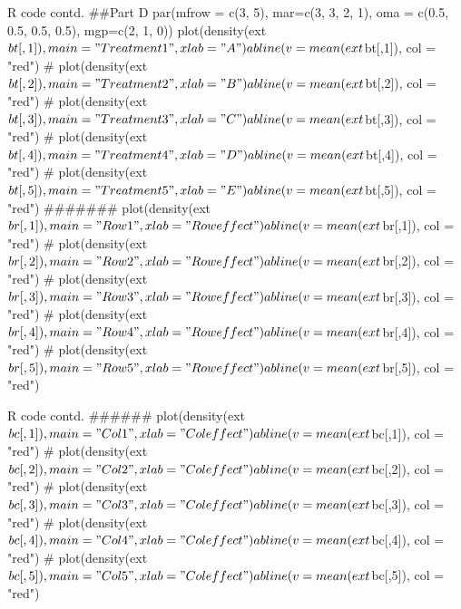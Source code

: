 \documentclass{article}
\begin{document}
\begin{sexylisting}{R code contd.}
##Part D
par(mfrow = c(3, 5),
    mar=c(3, 3, 2, 1),
    oma = c(0.5, 0.5, 0.5, 0.5), mgp=c(2, 1, 0))
plot(density(ext$bt[,1]), main = "Treatment 1",
     xlab = "A")
abline(v = mean(ext$bt[,1]), col = "red")
#
plot(density(ext$bt[,2]), main = "Treatment 2",
     xlab = "B")
abline(v = mean(ext$bt[,2]), col = "red")
#
plot(density(ext$bt[,3]), main = "Treatment 3",
     xlab = "C")
abline(v = mean(ext$bt[,3]), col = "red")
#
plot(density(ext$bt[,4]), main = "Treatment 4",
     xlab = "D")
abline(v = mean(ext$bt[,4]), col = "red")
#
plot(density(ext$bt[,5]), main = "Treatment 5",
     xlab = "E")
abline(v = mean(ext$bt[,5]), col = "red")
#######
plot(density(ext$br[,1]), main = "Row 1", 
xlab = "Row effect")
abline(v = mean(ext$br[,1]), col = "red")
#
plot(density(ext$br[,2]), main = "Row 2", 
xlab = "Row effect")
abline(v = mean(ext$br[,2]), col = "red")
#
plot(density(ext$br[,3]), main = "Row 3", 
xlab = "Row effect")
abline(v = mean(ext$br[,3]), col = "red")
#
plot(density(ext$br[,4]), main = "Row 4", 
xlab = "Row effect")
abline(v = mean(ext$br[,4]), col = "red")
#
plot(density(ext$br[,5]), main = "Row 5", 
xlab = "Row effect")
abline(v = mean(ext$br[,5]), col = "red")
\end{sexylisting}
\begin{sexylisting}{R code contd.}
######
plot(density(ext$bc[,1]), main = "Col 1", 
xlab = "Col effect")
abline(v = mean(ext$bc[,1]), col = "red")
#
plot(density(ext$bc[,2]), main = "Col 2", 
xlab = "Col effect")
abline(v = mean(ext$bc[,2]), col = "red")
#
plot(density(ext$bc[,3]), main = "Col 3", 
xlab = "Col effect")
abline(v = mean(ext$bc[,3]), col = "red")
#
plot(density(ext$bc[,4]), main = "Col 4", 
xlab = "Col effect")
abline(v = mean(ext$bc[,4]), col = "red")
#
plot(density(ext$bc[,5]), main = "Col 5", 
xlab = "Col effect")
abline(v = mean(ext$bc[,5]), col = "red")
\end{sexylisting}
\end{document}
